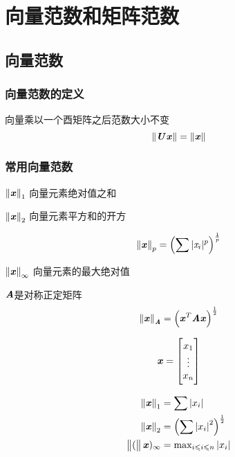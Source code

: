 \chapter{向量范数和矩阵范数}
\label{cha:向量范数和矩阵范数}



\section{向量范数}
\label{sec:向量范数}

\subsection{向量范数的定义}
\label{sub:向量范数的定义}

\begin{definition}[向量范数是酉不变的]
    向量乘以一个酉矩阵之后范数大小不变
    \[
        \norm{\MU\Vx} = \norm{\Vx}
    \]
\end{definition}

\subsection{常用向量范数}
\label{sub:常用向量范数}

\begin{definition}[1-范数或$l_1$范数]
    $\norm{\Vx}_1$ \quad 向量元素绝对值之和
\end{definition}

\begin{definition}[2-范数或$l_2$范数]
    $\norm{\Vx}_2$ \quad 向量元素平方和的开方
\end{definition}


\begin{definition}[p-范数或$l_p$范数]
    $$
    \norm{\Vx}_p = \left( \sum |\Sx_i|^p \right)^{\frac{1}{p}}
    $$
\end{definition}

\begin{definition}
    $\norm{\Vx}_{\infty}$ 向量元素的最大绝对值
\end{definition}

\begin{definition}
    $\MA$是对称正定矩阵
    $$
    \norm{\Vx}_{\MA} = \left( \Vx^T\MA\Vx \right)^{\frac{1}{2}}
    $$
\end{definition}
\[
    \vxx
\]

\begin{align}
    \norm{\Vx}_1 &= \sum \abs{x_i} \\
    \norm{\Vx}_2 &= \left(\sum \abs{x_i}^2\right)^{\frac{1}{2}} \\
    \norm(\Vx)_{\infty} &= {\max}_{i \leqslant i \leqslant n}\abs{x_i}
\end{align}

